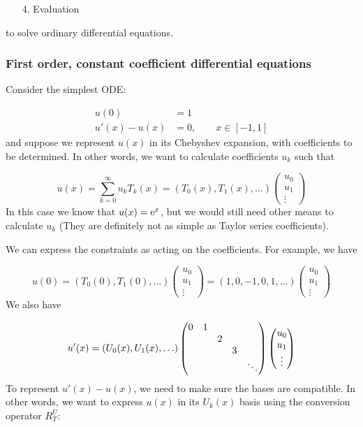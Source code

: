 \documentclass[12pt,a4paper]{article}
\begin{document}
\begin{itemize}
\item[4. ] Evaluation

\end{itemize}
to solve ordinary differential equations.

\subsubsection{First order, constant coefficient differential equations}
Consider the simplest ODE:


\begin{align*}
u(0) &= 1 \\
u'(x) - u(x) &= 0, \qquad x \in [-1, 1]
\end{align*}
and suppose we represent $u(x)$ in its Chebyshev expansion, with coefficients to be determined. In other words, we want to calculate coefficients $u_k$ such that

\[
u(x) = \sum_{k=0}^\infty u_k T_k(x) = (T_0(x), T_1(x), \ldots) \begin{pmatrix} u_0 \\ u_1 \\ \vdots \end{pmatrix}
\]
In this case we know that $u(x) = {\rm e}^x$, but we would still need other means to calculate $u_k$ (They are definitely not as simple as Taylor series coefficients).

We can express the constraints as acting on the coefficients. For example, we have

\[
u(0) = (T_0(0), T_1(0), \ldots) \begin{pmatrix} u_0\\u_1\\\vdots \end{pmatrix} = (1,0,-1,0,1,\ldots)  \begin{pmatrix} u_0\\u_1\\\vdots \end{pmatrix}
\]
We also have

\[
u'(x) = (U_0(x),U_1(x),\ldots) \begin{pmatrix}
0 & 1 \cr
&& 2 \cr
&&& 3 \cr
&&&&\ddots
\end{pmatrix}\begin{pmatrix} u_0\\u_1\\\vdots \end{pmatrix}
\]
To represent $u'(x) - u(x)$, we need to make sure the bases are compatible. In other words, we want to express $u(x)$ in its $U_k(x)$ basis using the conversion operator $R_T^{U}$:
\end{document}
